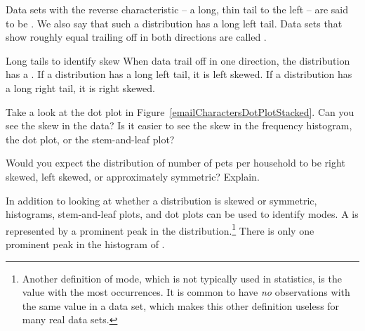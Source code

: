 Data sets with the reverse characteristic -- a long, thin tail to the left -- are said to be . We also say that such a distribution has a long left tail. Data sets that show roughly equal trailing off in both directions are called .

\begin{onebox}{Long tails to identify skew}
When data trail off in one direction, the distribution has a .  If a distribution has a long left tail, it is left skewed. If a distribution has a long right tail, it is right skewed.\end{onebox}

\begin{exercisewrap}
\begin{nexercise}
Take a look at the dot plot in Figure~\ref{emailCharactersDotPlotStacked}. Can you see the skew in the data? Is it easier to see the skew in the frequency histogram, the dot plot, or the stem-and-leaf plot?\footnotemark
\end{nexercise}
\end{exercisewrap}

\begin{exercisewrap}
\begin{nexercise}
Would you expect the distribution of number of pets per household to be right skewed, left skewed, or approximately symmetric?  Explain.\footnotemark
\end{nexercise}
\end{exercisewrap}

\D{\newpage}

In addition to looking at whether a distribution is skewed or symmetric, histograms, stem-and-leaf plots, and dot plots can be used to identify modes. A  is represented by a prominent peak in the distribution.\footnote{Another definition of mode, which is not typically used in statistics, is the value with the most occurrences. It is common to have \emph{no} observations with the same value in a data set, which makes this other definition useless for many real data sets.} There is only one prominent peak in the histogram of .

